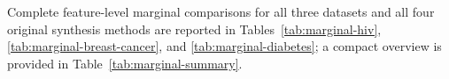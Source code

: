 Complete feature-level marginal comparisons for all three datasets and all four original synthesis methods are reported in Tables~\ref{tab:marginal-hiv}, \ref{tab:marginal-breast-cancer}, and \ref{tab:marginal-diabetes}; a compact overview is provided in Table~\ref{tab:marginal-summary}.
